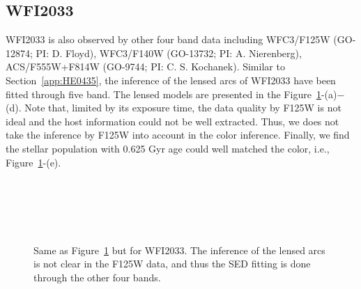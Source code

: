 \documentclass[fleqn,usenatbib]{mnras}
\newcommand{\ding}[1]{\textcolor{red}{[{\bf Xuheng}: #1]}}
\begin{document}

\subsection{WFI2033}\label{app:WFI2033}
WFI2033 is also observed by other four band data including WFC3/F125W (GO-12874; PI: D. Floyd), WFC3/F140W (GO-13732; PI: A. Nierenberg), ACS/F555W+F814W  (GO-9744; PI: C. S. Kochanek). Similar to Section~\ref{app:HE0435}, the inference of the lensed arcs of WFI2033 have been fitted through five band. The lensed models are presented in the Figure~\ref{fig:app_WFI2033}-(a)$-$(d). Note that, limited by its exposure time, the data quality by F125W is not ideal and the host information could not be well extracted. Thus, we does not take the inference by F125W into account in the color inference. Finally, we find the stellar population with 0.625 Gyr age could well matched the color, i.e., Figure~\ref{fig:app_WFI2033}-(e).
\begin{figure}
\centering
{}\\
\\
\\
\\
\caption{\label{fig:app_WFI2033} 
Same as Figure~\ref{fig:app_WFI2033} but for WFI2033. The inference of the lensed arcs is not clear in the F125W data, and thus the SED fitting is done through the other four bands.}
\end{figure} 


\bsp	%
\label{lastpage}
\end{document}
